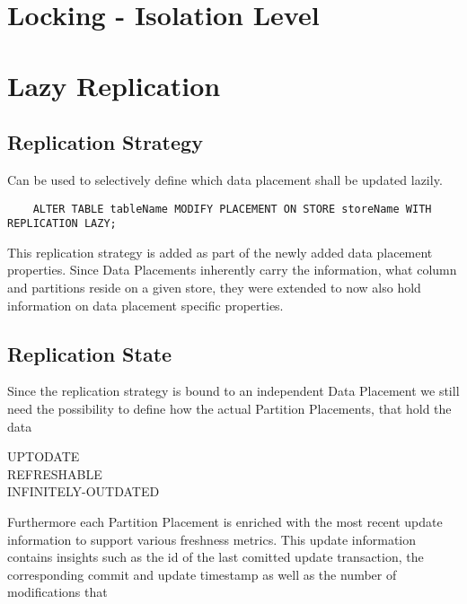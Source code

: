 
\section{Locking - Isolation Level}




\section{Lazy Replication}

\subsection{Replication Strategy}
Can be used to selectively define which data placement shall be updated lazily.
\begin{verbatim}
    ALTER TABLE tableName MODIFY PLACEMENT ON STORE storeName WITH REPLICATION LAZY;
\end{verbatim}

This replication strategy is added as part of the newly added data placement properties. Since Data Placements inherently carry the information, what column and partitions reside
on a given store, they were extended to now also hold information on data placement specific properties.





\subsection{Replication State}

Since the replication strategy is bound to an independent Data Placement we still need the possibility to define how the actual Partition Placements, that hold the data 


\begin{description}
    \item [UPTODATE]
    \item [REFRESHABLE]
    \item [INFINITELY-OUTDATED]
\end{description}

Furthermore each Partition Placement is enriched with the most recent update information to support various freshness metrics.
This update information contains insights such as the id of the last comitted update transaction, the corresponding commit and update timestamp as well as the number of 
modifications that 


